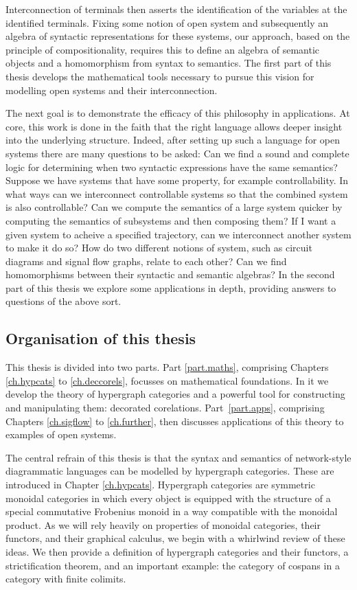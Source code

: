 Interconnection of terminals then asserts the identification of the variables at
the identified terminals. Fixing some notion of open system and subsequently an
algebra of syntactic representations for these systems, our approach, based on
the principle of compositionality, requires this to define an algebra of
semantic objects and a homomorphism from syntax to semantics. The first part of
this thesis develops the mathematical tools necessary to pursue this vision for
modelling open systems and their interconnection. 

The next goal is to demonstrate the efficacy of this philosophy in applications.
At core, this work is done in the faith that the right language allows deeper
insight into the underlying structure. Indeed, after setting up such a language
for open systems there are many questions to be asked: Can we find a sound and
complete logic for determining when two syntactic expressions have the same
semantics? Suppose we have systems that have some property, for example
controllability.  In what ways can we interconnect controllable systems so that
the combined system is also controllable? Can we compute the semantics of a
large system quicker by computing the semantics of subsystems and then composing
them?  If I want a given system to acheive a specified trajectory, can we
interconnect another system to make it do so? How do two different notions of
system, such as circuit diagrams and signal flow graphs, relate to each other?
Can we find homomorphisms between their syntactic and semantic algebras? In the
second part of this thesis we explore some applications in depth, providing
answers to questions of the above sort.


\subsection*{Organisation of this thesis}

This thesis is divided into two parts. Part \ref{part.maths}, comprising
Chapters \ref{ch.hypcats} to \ref{ch.deccorels}, focusses on mathematical
foundations. In it we develop the theory of hypergraph categories and a powerful
tool for constructing and manipulating them: decorated corelations.
Part~\ref{part.apps}, comprising Chapters \ref{ch.sigflow} to \ref{ch.further},
then discusses applications of this theory to examples of open systems.

The central refrain of this thesis is that the syntax and semantics of
network-style diagrammatic languages can be modelled by hypergraph categories.
These are introduced in Chapter \ref{ch.hypcats}. Hypergraph categories are
symmetric monoidal categories in which every object is equipped with the
structure of a special commutative Frobenius monoid in a way compatible with the
monoidal product. As we will rely heavily on properties of monoidal categories,
their functors, and their graphical calculus, we begin with a whirlwind review
of these ideas. We then provide a definition of hypergraph categories and their
functors, a strictification theorem, and an important example: the category of
cospans in a category with finite colimits.

